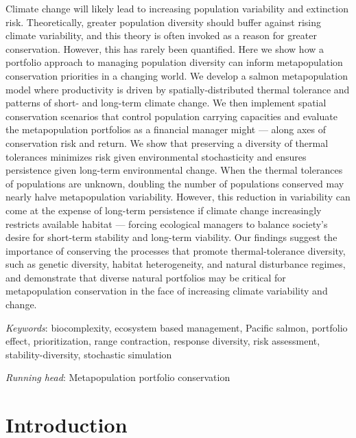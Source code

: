 \documentclass[12pt,english]{article}
\begin{document}
\begin{spacing}{1.3}
Climate change will likely lead to increasing population variability and extinction risk. Theoretically, greater population diversity should buffer against rising climate variability, and this theory is often invoked as a reason for greater conservation. However, this has rarely been quantified. Here we show how a portfolio approach to managing population diversity can inform metapopulation conservation priorities in a changing world. We develop a salmon metapopulation model where productivity is driven by spatially-distributed thermal tolerance and patterns of short- and long-term climate change. We then implement spatial conservation scenarios that control population carrying capacities and evaluate the metapopulation portfolios as a financial manager might --- along axes of conservation risk and return. We show that preserving a diversity of thermal tolerances minimizes risk given environmental stochasticity and ensures persistence given long-term environmental change. When the thermal tolerances of populations are unknown, doubling the number of populations conserved may nearly halve metapopulation variability. However, this reduction in variability can come at the expense of long-term persistence if climate change increasingly restricts available habitat --- forcing ecological managers to balance society's desire for short-term stability and long-term viability. Our findings suggest the importance of conserving the processes that promote thermal-tolerance diversity, such as genetic diversity, habitat heterogeneity, and natural disturbance regimes, and demonstrate that diverse natural portfolios may be critical for metapopulation conservation in the face of increasing climate variability and change.

\noindent
\textit{Keywords}: biocomplexity, ecosystem based management, Pacific salmon, portfolio effect, prioritization, range contraction, response diversity, risk assessment, stability-diversity, stochastic simulation

\noindent
\textit{Running head}: Metapopulation portfolio conservation

\clearpage

\section{Introduction}\label{introduction}


\end{spacing}
\end{document}
